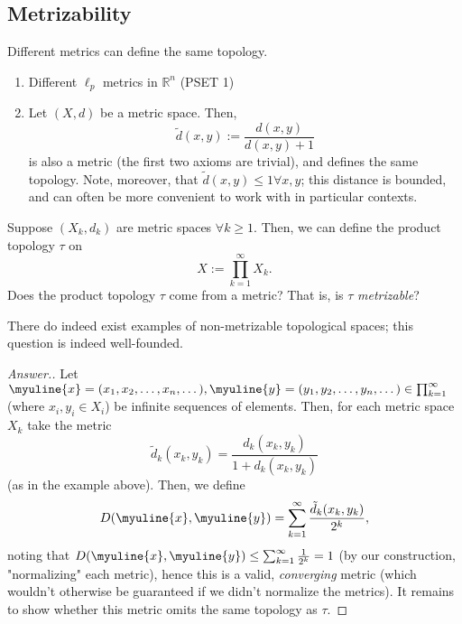 \subsection{Metrizability}

\begin{proposition}
    Different metrics can define the same topology.
\end{proposition}
\begin{example}
    \begin{enumerate}
        \item Different $\ell_p$ metrics in $\mathbb{R}^n$ (PSET 1)
        \item Let $(X, d)$ be a metric space. Then, \[
        \tilde{d}(x,y) := \frac{d(x,y)}{d(x,y)+1}
        \]
        is also a metric (the first two axioms are trivial), and defines the same topology. Note, moreover, that $\tilde{d}(x,y) \leq 1 \forall x, y$; this distance is bounded, and can often be more convenient to work with in particular contexts.
    \end{enumerate}
\end{example}

\begin{question}
    Suppose $(X_k, d_k)$ are metric spaces $\forall k \geq 1$. Then, we can define the product topology $\tau$ on  \[
        X := \prod_{k=1}^{\infty} X_k.    
        \]
        Does the product topology $\tau$ come from a metric? That is, is $\tau$ \emph{metrizable}?
\end{question}

\begin{remark}
    There do indeed exist examples of non-metrizable topological spaces; this question is indeed well-founded.
\end{remark}

\begin{proof}[Answer.]
    Let $\myuline{x}=(x_1, x_2, \dots, x_n, \dots), \myuline{y}=(y_1, y_2, \dots, y_n, \dots) \in \prod_{k=1}^\infty$ (where $x_i, y_i \in X_i$) be infinite sequences of elements. Then, for each metric space $X_k$ take the metric $$\tilde{d}_k(x_k, y_k) = \frac{d_k(x_k,y_k)}{1+d_k(x_k,y_k)}$$ (as in the example above). Then, we define \[
    D(\myuline{x}, \myuline{y}) = \sum_{k=1}^{\infty} \frac{\tilde{d}_k(x_k, y_k)}{2^k},
    \]
    noting that $D(\myuline{x}, \myuline{y}) \leq \sum_{k=1}^\infty \frac{1}{2^k} = 1$ (by our construction, "normalizing" each metric), hence this is a valid, \emph{converging} metric (which wouldn't otherwise be guaranteed if we didn't normalize the metrics). It remains to show whether this metric omits the same topology as $\tau$. 
\end{proof}

